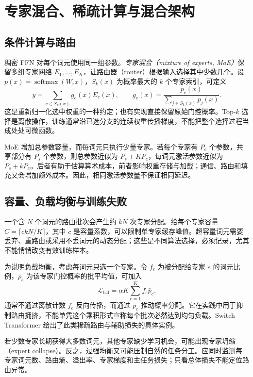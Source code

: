 \setcounter{chapter}{5} %
\chapter{专家混合、稀疏计算与混合架构}
\label{ch:moe}

\section{条件计算与路由}

稠密 FFN 对每个词元使用同一组参数。\emph{专家混合（mixture of experts, MoE）}保留多组专家网络 $E_1,\ldots,E_K$，让路由器（router）根据输入选择其中少数几个。设 $p(x)=\operatorname{softmax}(W_rx)$，$S_k(x)$ 为概率最大的 $k$ 个专家索引，可定义
\begin{equation}
y=\sum_{e\in S_k(x)}g_e(x)E_e(x),\qquad
g_e(x)=\frac{p_e(x)}{\sum_{j\in S_k(x)}p_j(x)}.
\label{eq:moe}
\end{equation}
这是重新归一化选中权重的一种约定；也有实现直接保留原始门控概率。Top-$k$ 选择是离散操作，训练通常沿已选分支的连续权重传播梯度，不能把整个选择过程当成处处可微函数。

MoE 增加总参数容量，而每词元只执行少量专家。若每个专家有 $P_e$ 个参数，共享部分有 $P_s$ 个参数，则总参数近似为 $P_s+KP_e$，每词元激活参数近似为 $P_s+kP_e$。后者有助于估算算术成本，前者影响权重存储与加载；通信、路由和填充又会增加额外成本。因此，相同激活参数量不保证相同延迟。

\section{容量、负载均衡与训练失败}

一个含 $N$ 个词元的路由批次会产生约 $kN$ 次专家分配。给每个专家容量 $C=\lceil c kN/K\rceil$，其中 $c$ 是容量系数，可以限制单专家缓存峰值。超容量词元需要丢弃、重路由或采用不丢词元的动态分配；这些是不同算法选择，必须记录，尤其不能悄悄改变有效训练样本。

为说明负载均衡，考虑每词元只选一个专家。令 $f_e$ 为被分配给专家 $e$ 的词元比例，$\bar p_e$ 为该专家门控概率的批平均值，可加入
\[
\mathcal L_{\mathrm{bal}}=\alpha K\sum_{e=1}^Kf_e\bar p_e.
\]
通常不通过离散计数 $f_e$ 反向传播，而通过 $\bar p_e$ 推动概率分配。它在实践中用于抑制路由拥挤，不能单凭这个乘积形式宣称每个批次必然达到均匀负载。Switch Transformer 给出了此类稀疏路由与辅助损失的具体实例\cite{switch}。

若少数专家长期获得大多数词元，其他专家缺少学习机会，可能出现专家坍缩（expert collapse）。反之，过强均衡又可能压制自然的任务分工。应同时监测每专家词元数、路由熵、溢出率、专家梯度和主任务损失；只看总体损失不能定位路由异常。

